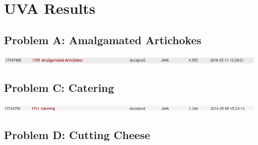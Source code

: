 \documentclass[12pt]{article}
\begin{document}

\newcommand{\hmwkClass}{CS 255}
\newcommand{\hmwkSemester}{Spring 2016}

\newcommand{\hmwkAuthorName}{Christian Rentsman}
\newcommand{\hmwkAuthorID}{crentsman}

\newcommand{\hmwkAssignmentNum}{5}

\newcommand{\hmwkProblemNum}{1}

\newcommand{\hmwkCollaborators}{}
\thispagestyle{fancycollab}


\section{UVA Results}

\subsection{Problem A: Amalgamated Artichokes}

\begin{center}
    \includegraphics[width=\textwidth]{artichoke_result}
\end{center}

\subsection{Problem C: Catering}

\begin{center}
    \includegraphics[width=\textwidth]{catering_result}
\end{center}

\subsection{Problem D: Cutting Cheese}
\end{document}

